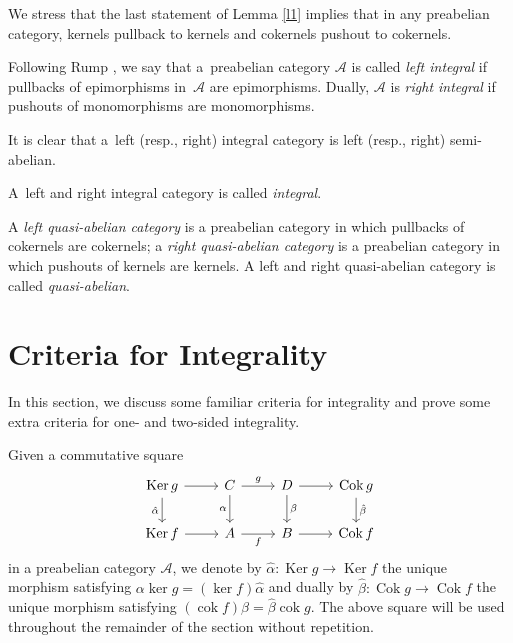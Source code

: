 \documentclass[a4paper,10pt,reqno]{amsart}
\newcommand{\Ker}{\operatorname{Ker}\nolimits}
\newcommand{\Coker}{\operatorname{Cok}\nolimits}
\newcommand{\Cok}{\operatorname{Cok}\nolimits}
\newcommand{\coker}{\operatorname{cok}\nolimits}
\begin{document}
	We stress that the last statement of Lemma \ref{l1} implies that in any preabelian category, kernels pullback to kernels and cokernels pushout to cokernels.
	
	Following Rump \cite{Rump2001}, we say that a~preabelian category
	$\mathcal{A}$ is called {\em left integral} if pullbacks of epimorphisms in~$\mathcal{A}$ are epimorphisms. Dually,
	$\mathcal{A}$ is {\em right integral} if pushouts of monomorphisms are monomorphisms. 
	
	It is clear that a~left (resp., right) integral category is left (resp., right) semi-abelian. 
	
	A~left and right integral category is called {\em integral}. 
	
	A {\it left quasi-abelian category} is a preabelian category in which pullbacks of cokernels are cokernels; a {\em right quasi-abelian category} is a preabelian category in which pushouts of kernels are kernels. A left and right quasi-abelian category is called {\em quasi-abelian}.
	
	
	\section{Criteria for Integrality}\label{CrInt}
	
	In this section, we discuss some familiar criteria for integrality and prove some extra criteria for one- and two-sided integrality. 
	
	\smallskip
	
	Given a commutative square
	\begin{equation}\label{sq1}
		\begin{tikzcd}
			\Ker g \arrow[r] \arrow[d, "\hat{\alpha}"'] & C \arrow[r, "g"] \arrow[d, "\alpha"'] & D \arrow[d, "\beta"] \arrow[r] & \Cok g \arrow[d, "\hat{\beta}"] \\
			\Ker f \arrow[r]                            & A \arrow[r, "f"']                     & B \arrow[r]                    & \Cok f                         
		\end{tikzcd}
	\end{equation}
	in a preabelian category $\mathcal{A}$, we denote by $\hat\alpha\colon\Ker g\rightarrow\Ker f$ the unique morphism satisfying $\alpha\ker g=(\ker f)\hat\alpha$ and dually by $\hat\beta\colon\Coker g\rightarrow\Coker f$ the unique morphism satisfying $(\coker f)\beta=\hat\beta\coker g$. The above square will be used throughout the remainder of the section without repetition. 
	
\end{document}
